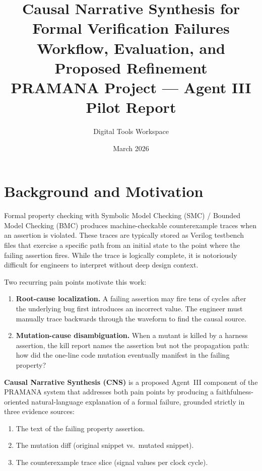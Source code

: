 \documentclass[11pt,a4paper]{article}
\title{%
  \textbf{Causal Narrative Synthesis for Formal Verification Failures}\\[6pt]
  \large Workflow, Evaluation, and Proposed Refinement\\[10pt]
  \normalsize PRAMANA Project --- Agent III Pilot Report
}
\author{Digital Tools Workspace}
\date{March 2026}
\begin{document}
\maketitle
\tableofcontents
\newpage

\section{Background and Motivation}

Formal property checking with Symbolic Model Checking (SMC) / Bounded Model
Checking (BMC) produces machine-checkable counterexample traces when an
assertion is violated. These traces are typically stored as Verilog testbench
files that exercise a specific path from an initial state to the point where
the failing assertion fires. While the trace is logically complete, it is
notoriously difficult for engineers to interpret without deep design context.

Two recurring pain points motivate this work:

\begin{enumerate}
  \item \textbf{Root-cause localization.}  A failing assertion may fire tens of
    cycles after the underlying bug first introduces an incorrect value. The
    engineer must manually trace backwards through the waveform to find the
    causal source.

  \item \textbf{Mutation-cause disambiguation.}  When a mutant is killed by a
    harness assertion, the kill report names the assertion but not the
    propagation path: how did the one-line code mutation eventually manifest in
    the failing property?
\end{enumerate}

\textbf{Causal Narrative Synthesis (CNS)} is a proposed Agent~III component of
the PRAMANA system that addresses both pain points by producing a
faithfulness-oriented natural-language explanation of a formal failure,
grounded strictly in three evidence sources:

\begin{enumerate}
  \item The text of the failing property assertion.
  \item The mutation diff (original snippet vs.\ mutated snippet).
  \item The counterexample trace slice (signal values per clock cycle).
\end{enumerate}
\end{document}
